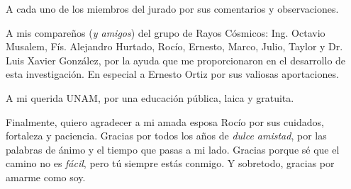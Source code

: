 A cada uno de los miembros del jurado por sus comentarios y observaciones.  

A mis compareños (\emph{y amigos}) del grupo de Rayos Cósmicos: Ing. Octavio Musalem, Fís. Alejandro Hurtado, Rocío, Ernesto, Marco, Julio, Taylor y Dr. Luis Xavier González, por la ayuda que me proporcionaron en el desarrollo de esta investigación. En especial a Ernesto Ortiz por sus valiosas aportaciones.   

A mi querida UNAM, por una educación pública, laica y gratuita.

Finalmente, quiero agradecer a mi amada esposa Rocío por sus cuidados, fortaleza y paciencia. Gracias por todos los años de \emph{dulce amistad}, por las palabras de ánimo y el tiempo que pasas a mi lado. Gracias porque sé que el camino no es \emph{fácil}, pero tú siempre estás conmigo. Y sobretodo, gracias por amarme como soy. 

\vspace*{\fill}